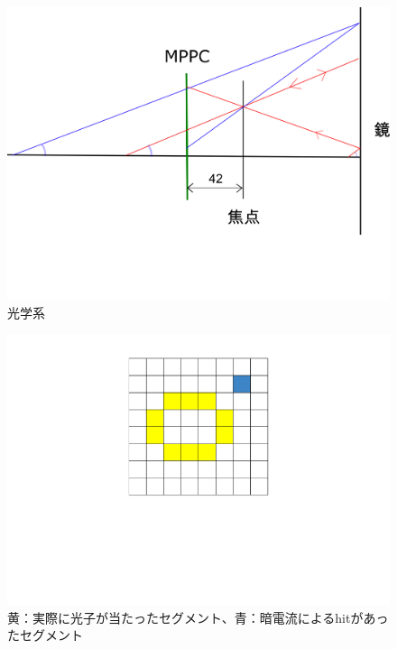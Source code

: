\documentclass[uplatex, titlepage, dvipdfmx, 12pt, a4paper]{jsreport}
\begin{document}
      \begin{figure}[h]
        \begin{center} 
          \includegraphics[scale=1, clip]{image/optical_system.png}
          \caption{光学系} 
          \label{fig:optical_system} 
        \end{center}
      \end{figure}
      \begin{figure}[h]
        \begin{center} 
          \includegraphics[scale=0.4, clip]{image/dark_current_image.pdf}
          \caption{黄：実際に光子が当たったセグメント、青：暗電流によるhitがあったセグメント} 
          \label{fig:darkcurrent_image} 
        \end{center}
      \end{figure}
\end{document}
